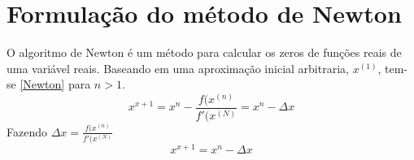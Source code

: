 





\section{Formula\c{c}\~ao do m\'etodo de Newton}
\label{SectionNewton}
O algoritmo de Newton é um método para calcular os zeros de funções reais de uma variável reais. Baseando em uma aproximação inicial arbitraria, $x^{(1)}$, tem-se \ref{Newton} para $n>1$. \cite{newton}
\begin{equation}
    x^{x+1} = x^{n} - \frac{f(x^{(n)}}{f'(x^{(N)}} = x^{n} - \Delta x
    \label{Newton}
\end{equation}
Fazendo $\Delta x = \frac{f(x^{(n)}}{f'(x^{(N)}}$ 
\begin{equation}
    x^{x+1} = x^{n} - \Delta x
    \label{Newton_Delta}
\end{equation}
